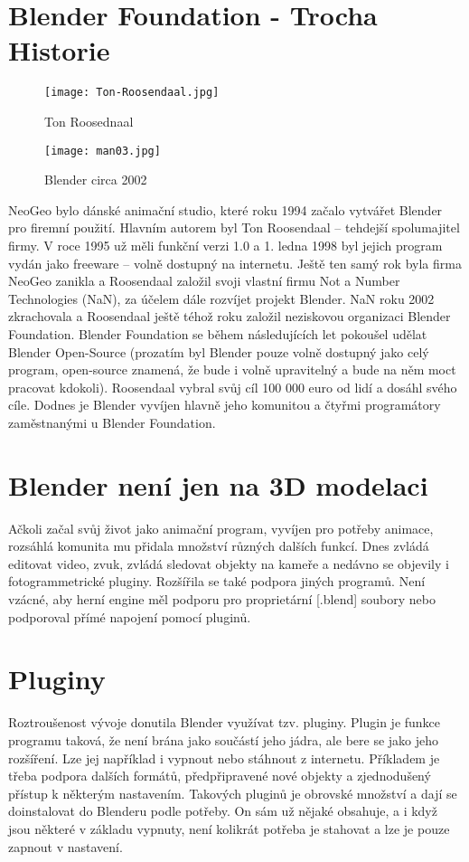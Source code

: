\documentclass[12pt,a4paper]{report}
\begin{document}
	\section{Blender Foundation - Trocha Historie \\ \cite{wikiBlender}}
	\begin{figure}[h]
		\centering
		\texttt{[image: Ton-Roosendaal.jpg]}
		\caption{Ton Roosednaal \cite{ton-roosendaal}}
		\label{pic:ton-roosendaal}
	\end{figure}
	
	\begin{figure}[h]
		\centering
		\texttt{[image: man03.jpg]}
		\caption{Blender circa 2002 \cite{blender-man}}
		\label{pic:blender-man}
	\end{figure}
	NeoGeo bylo dánské animační studio, které roku 1994 začalo vytvářet
	Blender pro firemní použití. Hlavním autorem byl Ton Roosendaal –
	tehdejší spolumajitel firmy. V roce 1995 už měli funkční verzi 1.0 a 1.
	ledna 1998 byl jejich program vydán jako freeware – volně dostupný na
	internetu. Ještě ten samý rok byla firma NeoGeo zanikla a Roosendaal
	založil svoji vlastní firmu Not a Number Technologies (NaN), za účelem
	dále rozvíjet projekt Blender. NaN roku 2002 zkrachovala a Roosendaal
	ještě téhož roku založil neziskovou organizaci Blender Foundation.
	Blender Foundation se během následujících let pokoušel udělat Blender
	Open-Source (prozatím byl Blender pouze volně dostupný jako celý
	program, open-source znamená, že bude i volně upravitelný a bude na
	něm moct pracovat kdokoli). Roosendaal vybral svůj cíl 100 000 euro od
	lidí a dosáhl svého cíle. Dodnes je Blender vyvíjen hlavně jeho komunitou
	a čtyřmi programátory zaměstnanými u Blender Foundation.
	
	\section{Blender není jen na 3D modelaci}
	Ačkoli začal svůj život jako animační program, vyvíjen pro potřeby
	animace, rozsáhlá komunita mu přidala množství různých dalších funkcí.
	Dnes zvládá editovat video, zvuk, zvládá sledovat objekty na kameře a
	nedávno se objevily i fotogrammetrické pluginy. Rozšířila se také podpora
	jiných programů. Není vzácné, aby herní engine měl podporu pro
	proprietární [.blend] soubory nebo podporoval přímé napojení pomocí
	pluginů.
	
	\section{Pluginy}
	Roztroušenost vývoje donutila Blender využívat tzv. pluginy. Plugin je
	funkce programu taková, že není brána jako součástí jeho jádra, ale bere
	se jako jeho rozšíření. Lze jej například i vypnout nebo stáhnout z
	internetu. Příkladem je třeba podpora dalších formátů, předpřipravené
	nové objekty a zjednodušený přístup k některým nastavením. Takových
	pluginů je obrovské množství a dají se doinstalovat do Blenderu podle
	potřeby. On sám už nějaké obsahuje, a i když jsou některé v základu
	vypnuty, není kolikrát potřeba je stahovat a lze je pouze zapnout v
	nastavení.
	
\end{document}
